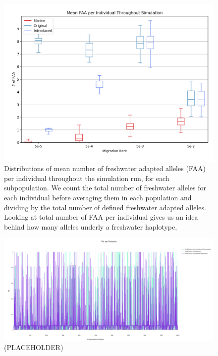 \documentclass{article}
\begin{document}
\begin{figure}
	\begin{center}
  		\includegraphics[width=\linewidth]{matplotlibPlots/MFAI.png}
  		\caption{Distributions of mean number of freshwater adapted alleles (FAA) per individual throughout the simulation run, for each subpopulation.
		We count the total number of freshwater alleles for each individual before averaging them in each population and dividing by the total number of defined
		freshwater adapted alleles.
		Looking at total number of FAA per individual gives us an idea behind how many alleles underly a freshwater haplotype, 
		}
  		\label{fig:MNFAI}
	\end{center}
\end{figure}

\begin{figure}[h!tb]
	\begin{center}
  		\includegraphics[width=0.7\linewidth]{plotlyPlots/FstAcross5e-5.png}
  		\caption{ (PLACEHOLDER)
		}
  		\label{fig:Fst1}
	\end{center}
\end{figure}
\end{document}
